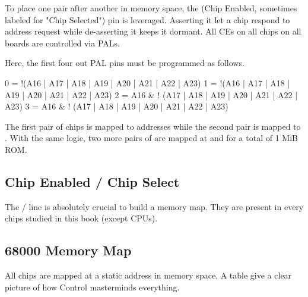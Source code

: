 To place one pair after another in memory space, the  (Chip Enabled, sometimes labeled  for "Chip Selected") pin is leveraged. Asserting it let a chip respond to address request while de-asserting it keeps it dormant. All CEs on all chips on all boards are controlled via PALs.

Here, the first four out PAL pins must be programmed as follows.

\begin{code}
0 = !(A16  | A17 | A18 | A19 | A20 | A21 | A22 | A23)  
1 = !(A16  | A17 | A18 | A19 | A20 | A21 | A22 | A23)  
2 = A16 & ! (A17 | A18 | A19 | A20 | A21 | A22 | A23)  
3 = A16 & ! (A17 | A18 | A19 | A20 | A21 | A22 | A23)  
\end{code}

The first pair of chips is mapped to addresses  while the second pair is mapped to . With the same logic, two more pairs of  are mapped at  and  for a total of 1 MiB ROM.


\subsection{Chip Enabled / Chip Select}

The  /  line is absolutely crucial to build a memory map. They are present in every chips studied in this book (except CPUs).

\subsection{68000 Memory Map}

All chips are mapped at a static address in memory space. A table give a clear picture of how Control masterminds everything.

